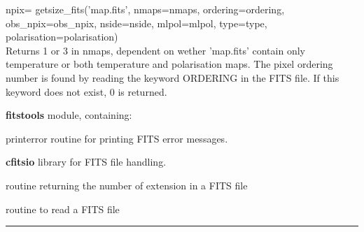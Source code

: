 \newpage
\begin{example}
{
npix= getsize\_fits('map.fits', nmaps=nmaps, ordering=ordering, obs\_npix=obs\_npix, nside=nside, mlpol=mlpol, type=type, polarisation=polarisation)  \\
}
{
Returns 1 or 3 in nmaps, dependent on wether 'map.fits' contain only
temperature or both temperature and polarisation maps. The pixel ordering number is found by reading the keyword ORDERING in the FITS file. If this keyword does not exist, 0 is returned.
}
\end{example}
\begin{modules}
  \begin{sulist}{} %
  \item[\textbf{fitstools}] module, containing:
  \item[printerror] routine for printing FITS error messages.
  \item[\textbf{cfitsio}] library for FITS file handling.		
  \end{sulist}
\end{modules}

\begin{related}
  \begin{sulist}{} %
  \item[\htmlref{getnumext\_fits}{sub:getnumext_fits}] routine returning the number of extension in a FITS
  file
  \item[\htmlref{input\_map}{sub:input_map}] routine to read a \healpix FITS file
  \end{sulist}
\end{related}

\rule{\hsize}{2mm}

\newpage
